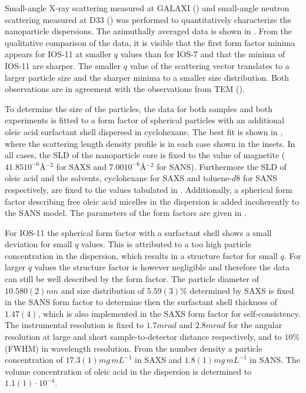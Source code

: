 \documentclass[\main/dresen_thesis.tex]{subfiles}
\begin{document}
  \label{sec:looselyPackedNS:nanoparticle:sas}
  Small-angle X-ray scattering measured at GALAXI () and small-angle neutron scattering measured at D33 () was performed to quantitatively characterize the nanoparticle dispersions.
  The azimuthally averaged data is shown in .
  From the qualitative comparison of the data, it is visible that the first form factor minima appears for IOS-11 at smaller $q$ values than for IOS-7 and that the minima of IOS-11 are sharper.
  The smaller $q$ value of the scattering vector translates to a larger particle size and the sharper minima to a smaller size distribution.
  Both observations are in agreement with the observations from TEM ().


    To determine the size of the particles, the data for both samples and both experiments is fitted to a form factor of spherical particles with an additional oleic acid surfactant shell dispersed in cyclohexane.
    The best fit is shown in , where the scattering length density profile is in each case shown in the insets.
    In all cases, the SLD of the nanoparticle core is fixed to the value of magnetite ($41.85 \unit{10^{-6} \angstrom^{-2}}$ for SAXS and $7.00 \unit{10^{-6} \angstrom^{-2}}$ for SANS).
    Furthermore the SLD of oleic acid and the solvents, cyclohexane for SAXS and toluene-$\mathit{d8}$ for SANS respectively, are fixed to the values tabulated in .
    Additionally, a spherical form factor describing free oleic acid micelles in the dispersion is added incoherently to the SANS model.
    The parameters of the form factors are given in .

    For IOS-11 the spherical form factor with a surfactant shell shows a small deviation for small $q$ values.
    This is attributed to a too high particle concentration in the dispersion, which results in a structure factor for small $q$.
    For larger $q$ values the structure factor is however negligible and therefore the data can still be well described by the form factor.
    The particle diameter of $10.580(2) \unit{nm}$ and size distribution of $5.59(3) \%$ determined by SAXS is fixed in the SANS form factor to determine then the surfactant shell thickness of $1.47(4)$, which is also implemented in the SAXS form factor for self-consistency.
    The instrumental resolution is fixed to $1.7 \unit{mrad}$ and $2.8 \unit{mrad}$ for the angular resolution at large and short sample-to-detector distance respectively, and to $10 \%$ (FWHM) in wavelength resolution.
    From the number density a particle concentration of $17.3(1) \unit{mg \, mL^{-1}}$ in SAXS and $1.8(1) \unit{mg \, mL^{-1}}$ in SANS.
    The volume concentration of oleic acid in the dispersion is determined to $1.1(1) \cdot 10^{-4}$.
\end{document}
